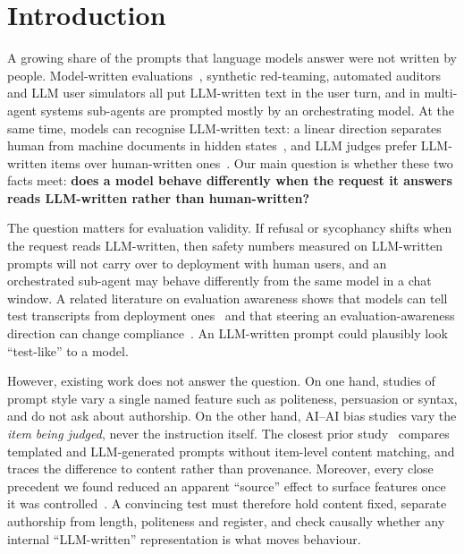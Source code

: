 \section{Introduction}
\label{sec:intro}

A growing share of the prompts that language models answer were not written by people.
Model-written evaluations~\citep{perez2022discovering}, synthetic red-teaming, automated auditors and LLM user simulators all put LLM-written text in the user turn, and in multi-agent systems sub-agents are prompted mostly by an orchestrating model.
At the same time, models can recognise LLM-written text: a linear direction separates human from machine documents in hidden states~\citep{chen2025repreguard,quaremba2026linear}, and LLM judges prefer LLM-written items over human-written ones~\citep{panickssery2024llm,laurito2025ai}.
Our main question is whether these two facts meet: {\bf does a model behave differently when the request it answers reads LLM-written rather than human-written?}

The question matters for evaluation validity.
If refusal or sycophancy shifts when the request reads LLM-written, then safety numbers measured on LLM-written prompts will not carry over to deployment with human users, and an orchestrated sub-agent may behave differently from the same model in a chat window.
A related literature on evaluation awareness shows that models can tell test transcripts from deployment ones~\citep{needham2025large} and that steering an evaluation-awareness direction can change compliance~\citep{abdelnabi2025hawthorne,nguyen2025probing}.
An LLM-written prompt could plausibly look ``test-like'' to a model.

However, existing work does not answer the question.
On one hand, studies of prompt style vary a single named feature such as politeness, persuasion or syntax, and do not ask about authorship.
On the other hand, AI--AI bias studies vary the \emph{item being judged}, never the instruction itself.
The closest prior study~\citep{chalkidis2026templated} compares templated and LLM-generated prompts without item-level content matching, and traces the difference to content rather than provenance.
Moreover, every close precedent we found reduced an apparent ``source'' effect to surface features once it was controlled~\citep{devbunova2026evaluation,ackerman2024inspection}.
A convincing test must therefore hold content fixed, separate authorship from length, politeness and register, and check causally whether any internal ``LLM-written'' representation is what moves behaviour.

